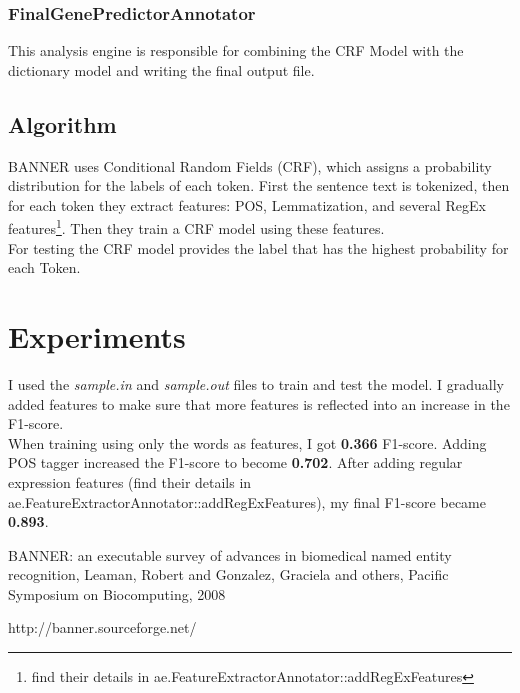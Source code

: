 \documentclass{article}
\begin{document}
\subsubsection{FinalGenePredictorAnnotator}
This analysis engine is responsible for combining the CRF Model with the dictionary model and writing the final output file.


\subsection{Algorithm}
BANNER \cite{banner} uses Conditional Random Fields (CRF), which assigns a probability distribution for the labels of each token. First the sentence text is tokenized, then for each token they extract features: POS, Lemmatization, and several RegEx features\footnote{find their details in ae.FeatureExtractorAnnotator::addRegExFeatures}. Then they train a CRF model using these features.\\

For testing the CRF model provides the label that has the highest probability for each Token.
\section{Experiments}

I used the \textit{sample.in} and \textit{sample.out} files to train and test the model. I gradually added features to make sure that more features is reflected into an increase in the F1-score.\\

When training using only the words as features, I got \textbf{0.366} F1-score. Adding POS tagger increased the F1-score to become \textbf{0.702}. After adding regular expression features (find their details in ae.FeatureExtractorAnnotator::addRegExFeatures), my final F1-score became \textbf{0.893}.

\begin{thebibliography}{9}


BANNER: an executable survey of advances in biomedical named entity recognition,
Leaman, Robert and Gonzalez, Graciela and others,
  Pacific Symposium on Biocomputing,
  2008

  http://banner.sourceforge.net/

\end{thebibliography}
\end{document}
